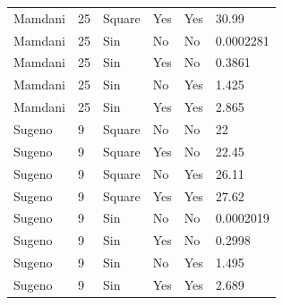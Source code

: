 \documentclass{article}
\begin{document}
\begin{table}[h]
\begin{adjustwidth}{-1cm}{}
\begin{tabular}{|p{1.7cm}|p{2.55cm}|p{3cm}|p{2.5cm}|p{2.5cm}|p{2.2cm}|}
Mamdani             & 25                    & Square                    & Yes                            & Yes                          & 30.99                \\
Mamdani             & 25                    & Sin                       & No                             & No                           & 0.0002281            \\
Mamdani             & 25                    & Sin                       & Yes                            & No                           & 0.3861               \\
Mamdani             & 25                    & Sin                       & No                             & Yes                          & 1.425                \\
Mamdani             & 25                    & Sin                       & Yes                            & Yes                          & 2.865                \\
Sugeno              & 9                     & Square                    & No                             & No                           & 22                   \\
Sugeno              & 9                     & Square                    & Yes                            & No                           & 22.45                \\
Sugeno              & 9                     & Square                    & No                             & Yes                          & 26.11                \\
Sugeno              & 9                     & Square                    & Yes                            & Yes                          & 27.62                \\
Sugeno              & 9                     & Sin                       & No                             & No                           & 0.0002019            \\
Sugeno              & 9                     & Sin                       & Yes                            & No                           & 0.2998               \\
Sugeno              & 9                     & Sin                       & No                             & Yes                          & 1.495                \\
Sugeno              & 9                     & Sin                       & Yes                            & Yes                          & 2.689                \\

\end{tabular}
\end{adjustwidth}
\end{table}
\end{document}
